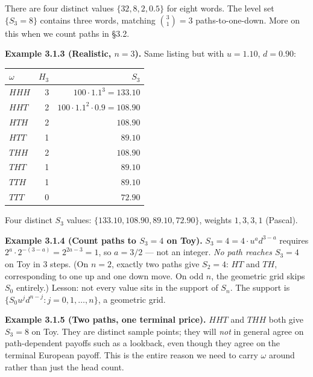 \documentclass[
  10pt,
  twoside]{book}
\newcounter{none} %
\begin{document}
There are four distinct values \(\{32, 8, 2, 0.5\}\) for eight words.
The level set \(\{S_3 = 8\}\) contains three words, matching
\(\binom{3}{1} = 3\) paths-to-one-down. More on this when we count paths
in §3.2.

\textbf{Example 3.1.3 (Realistic, \(n=3\)).} Same listing but with
\(u=1.10\), \(d=0.90\):

{\def\LTcaptype{none} %
\begin{table}[H]
\centering
\begin{tabular}{|l|r|r|}
\toprule
\(\omega\) & \(H_3\) & \(S_3\) \\
\midrule



\(HHH\) & 3 & \(100 \cdot 1.1^3 = 133.10\) \\
\(HHT\) & 2 & \(100 \cdot 1.1^2 \cdot 0.9 = 108.90\) \\
\(HTH\) & 2 & \(108.90\) \\
\(HTT\) & 1 & \(89.10\) \\
\(THH\) & 2 & \(108.90\) \\
\(THT\) & 1 & \(89.10\) \\
\(TTH\) & 1 & \(89.10\) \\
\(TTT\) & 0 & \(72.90\) \\
\bottomrule
\end{tabular}
\end{table}
}

Four distinct \(S_3\) values: \(\{133.10, 108.90, 89.10, 72.90\}\),
weights \(1,3,3,1\) (Pascal).

\textbf{Example 3.1.4 (Count paths to \(S_3 = 4\) on Toy).}
\(S_3 = 4 = 4 \cdot u^a d^{3-a}\) requires
\(2^a \cdot 2^{-(3-a)} = 2^{2a-3} = 1\), so \(a = 3/2\) --- not an
integer. \emph{No path reaches \(S_3 = 4\)} on Toy in 3 steps. (On
\(n=2\), exactly two paths give \(S_2 = 4\): \(HT\) and \(TH\),
corresponding to one up and one down move. On odd \(n\), the geometric
grid skips \(S_0\) entirely.) Lesson: not every value sits in the
support of \(S_n\). The support is
\(\{S_0 u^j d^{n-j} : j = 0,1,\ldots,n\}\), a geometric grid.

\textbf{Example 3.1.5 (Two paths, one terminal price).} \(HHT\) and
\(THH\) both give \(S_3 = 8\) on Toy. They are distinct sample points;
they will \emph{not} in general agree on path-dependent payoffs such as
a lookback, even though they agree on the terminal European payoff. This
is the entire reason we need to carry \(\omega\) around rather than just
the head count.
\end{document}
